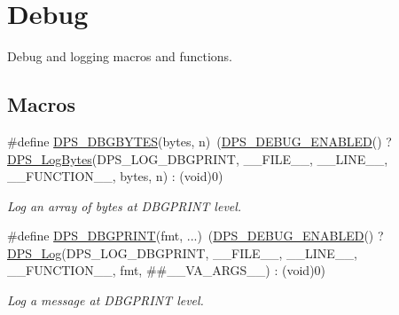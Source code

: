 \hypertarget{group__debug}{}\section{Debug}
\label{group__debug}


Debug and logging macros and functions.  


\subsection*{Macros}
\begin{DoxyCompactItemize}
\item 
\mbox{\label{group__debug_ga170843b022fc7bc00bf871eb5189fe52}} 
\#define \hyperlink{group__debug_ga170843b022fc7bc00bf871eb5189fe52}{D\+P\+S\+\_\+\+D\+B\+G\+B\+Y\+T\+ES}(bytes,  n)~(\hyperlink{group__debug_gaeca5ec86966717c8dd2d1ffda4be2b3b}{D\+P\+S\+\_\+\+D\+E\+B\+U\+G\+\_\+\+E\+N\+A\+B\+L\+ED}() ? \hyperlink{group__debug_ga7cc66c1e82ef557238c122b067f5337a}{D\+P\+S\+\_\+\+Log\+Bytes}(D\+P\+S\+\_\+\+L\+O\+G\+\_\+\+D\+B\+G\+P\+R\+I\+NT, \+\_\+\+\_\+\+F\+I\+L\+E\+\_\+\+\_\+, \+\_\+\+\_\+\+L\+I\+N\+E\+\_\+\+\_\+, \+\_\+\+\_\+\+F\+U\+N\+C\+T\+I\+O\+N\+\_\+\+\_\+, bytes, n) \+: (void)0)
\begin{DoxyCompactList}\small\item\em Log an array of bytes at D\+B\+G\+P\+R\+I\+NT level. \end{DoxyCompactList}\item 
\mbox{\label{group__debug_ga7ac5236c2ba157ffcf56cd073dcf0c3f}} 
\#define \hyperlink{group__debug_ga7ac5236c2ba157ffcf56cd073dcf0c3f}{D\+P\+S\+\_\+\+D\+B\+G\+P\+R\+I\+NT}(fmt, ...)~(\hyperlink{group__debug_gaeca5ec86966717c8dd2d1ffda4be2b3b}{D\+P\+S\+\_\+\+D\+E\+B\+U\+G\+\_\+\+E\+N\+A\+B\+L\+ED}() ? \hyperlink{group__debug_ga174fef61dca16376546e570c9b831502}{D\+P\+S\+\_\+\+Log}(D\+P\+S\+\_\+\+L\+O\+G\+\_\+\+D\+B\+G\+P\+R\+I\+NT, \+\_\+\+\_\+\+F\+I\+L\+E\+\_\+\+\_\+, \+\_\+\+\_\+\+L\+I\+N\+E\+\_\+\+\_\+, \+\_\+\+\_\+\+F\+U\+N\+C\+T\+I\+O\+N\+\_\+\+\_\+, fmt, \#\#\+\_\+\+\_\+\+V\+A\+\_\+\+A\+R\+G\+S\+\_\+\+\_\+) \+: (void)0)
\begin{DoxyCompactList}\small\item\em Log a message at D\+B\+G\+P\+R\+I\+NT level. \end{DoxyCompactList}\item 
\mbox{\label{group__debug_ga0a4156dc81e39b0cf2fb251e37bda307}} 

\end{DoxyCompactItemize}
